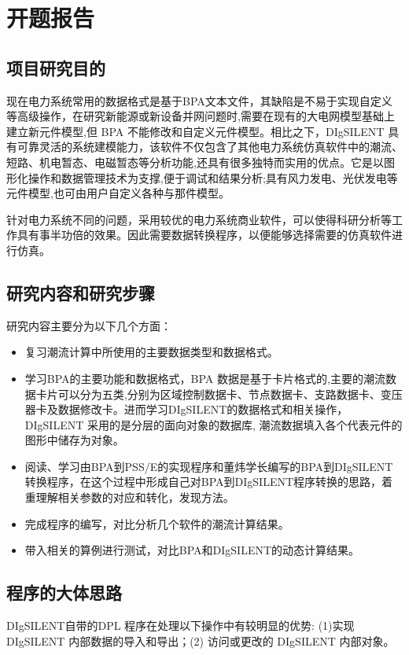 \chapter{开题报告}

\section{项目研究目的}
现在电力系统常用的数据格式是基于BPA文本文件，其缺陷是不易于实现自定义等高级操作，在研究新能源或新设备并网问题时,需要在现有的大电网模型基础上建立新元件模型,但 BPA 不能修改和自定义元件模型。相比之下，DIgSILENT 具有可靠灵活的系统建模能力，该软件不仅包含了其他电力系统仿真软件中的潮流、短路、机电暂态、电磁暂态等分析功能,还具有很多独特而实用的优点。它是以图形化操作和数据管理技术为支撑,便于调试和结果分析;具有风力发电、光伏发电等元件模型,也可由用户自定义各种与那件模型。

针对电力系统不同的问题，采用较优的电力系统商业软件，可以使得科研分析等工作具有事半功倍的效果。因此需要数据转换程序，以便能够选择需要的仿真软件进行仿真。

\section{研究内容和研究步骤}
研究内容主要分为以下几个方面：

\begin{itemize}
\item 复习潮流计算中所使用的主要数据类型和数据格式。
\item 学习BPA的主要功能和数据格式，BPA 数据是基于卡片格式的,主要的潮流数据卡片可以分为五类,分别为区域控制数据卡、节点数据卡、支路数据卡、变压器卡及数据修改卡。进而学习DIgSILENT的数据格式和相关操作，DIgSILENT 采用的是分层的面向对象的数据库, 潮流数据填入各个代表元件的图形中储存为对象。
\item 阅读、学习由BPA到PSS/E的实现程序和董炜学长编写的BPA到DIgSILENT转换程序，在这个过程中形成自己对BPA到DIgSILENT程序转换的思路，着重理解相关参数的对应和转化，发现方法。
\item 完成程序的编写，对比分析几个软件的潮流计算结果。
\item 带入相关的算例进行测试，对比BPA和DIgSILENT的动态计算结果。
\end{itemize}

\section{程序的大体思路}

DIgSILENT自带的DPL 程序在处理以下操作中有较明显的优势: (1)实现 DIgSILENT 内部数据的导入和导出；(2) 访问或更改的 DIgSILENT 内部对象。

